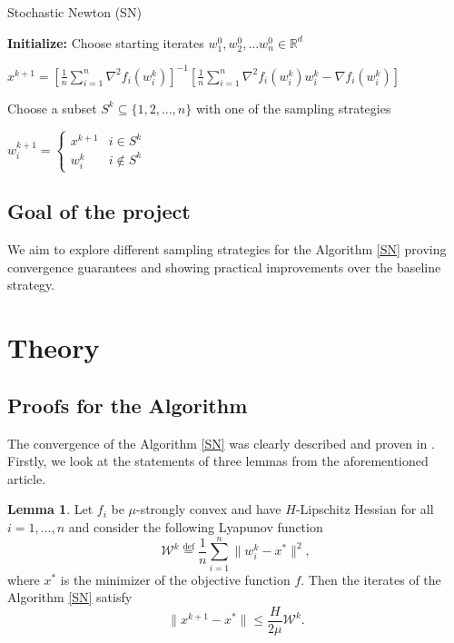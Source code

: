 \documentclass{article}
\theoremstyle{definition}
\theoremstyle{assumption}
\theoremstyle{lemma}
\newtheorem{lemma}{Lemma}
\theoremstyle{theorem}
\theoremstyle{proposition}
\begin{document}
	\begin{algorithm}
		\caption{Stochastic Newton (SN)}\label{SN}
		\begin{algorithmic}
			\item \textbf{Initialize:} Choose starting iterates $w_1^0, w_2^0, ... w_n^0 \in \mathbb R^d$
			
			\item {}	
			
				$ x^{k+1} = \left[ \frac{1}{n} \sum \limits_{i=1}^n \nabla^2 f_i(w_i^k) \right]^{-1} \left[ \frac{1}{n} \sum \limits_{i=1}^n \nabla^2 f_i(w_i^k) w_i^k - \nabla f_i(w_i^k) \right] $
				
				Choose a subset $S^k \subseteq \{ 1, 2, ..., n \}$ with one of the sampling strategies
				
				$w_i^{k+1} = 
				\begin{cases}
					x^{k+1} & i \in S^k \\
					w_i^k & i \notin S^k
				\end{cases}$
				
			\item \EndFor
		\end{algorithmic}
	\end{algorithm}

	\subsection{Goal of the project}
	
	We aim to explore different sampling strategies for the Algorithm \ref{SN} proving convergence guarantees and showing practical improvements over the baseline strategy.
	

\section{Theory}	
	
	\subsection{Proofs for the Algorithm}
	
	The convergence of the Algorithm \ref{SN} was clearly described and proven in \cite{kovalev2019stochastic}. Firstly, we look at the statements of three lemmas from the aforementioned article.
	
	\begin{lemma}\label{lemma:1}
		Let $f_i$ be $\mu$-strongly convex and have $H$-Lipschitz Hessian for all $i = 1,...,n$ and consider the following Lyapunov function
		\begin{equation}
			\mathcal W^k \overset{\text{def}} = \frac{1}{n} \sum \limits_{i=1}^n \| w_i^k - x^* \|^2,
		\end{equation}
		where $x^*$ is the minimizer of the objective function $f$. Then the iterates of the Algorithm \ref{SN} satisfy
		\begin{equation}
			\|x^{k+1} - x^*\| \leqslant \frac{H}{2 \mu} \mathcal W^k.
		\end{equation}
	\end{lemma}
\end{document}
